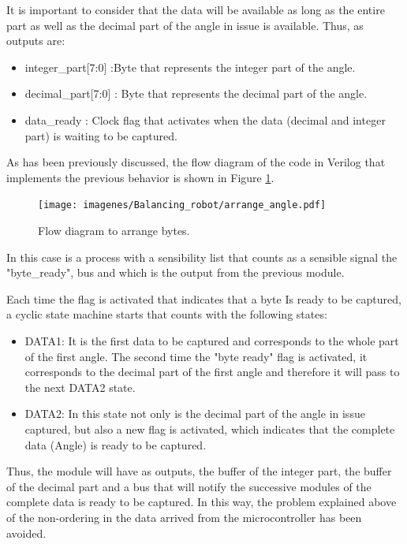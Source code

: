 It is important to consider that the data will be available as long as the entire part as well as the decimal part of the angle in issue is available. Thus, as outputs are:

\begin{itemize}
	\item integer\_part[7:0] :Byte that represents the integer part of the angle.
	\item decimal\_part[7:0] : Byte that represents the decimal part of the angle.
	\item data\_ready : Clock flag that activates when the data (decimal and integer part) is waiting to be captured.
\end{itemize}

As has been previously discussed, the flow diagram of the code in Verilog that implements the previous behavior is shown in Figure \ref{fig:arrange_angle}.

\begin{figure}[H]
	\center
	\texttt{[image: imagenes/Balancing\_robot/arrange\_angle.pdf]}
	\caption{Flow diagram to arrange bytes.}
	\label{fig:arrange_angle}
\end{figure}



In this case is a process with a sensibility list that counts as a sensible signal the "byte\_ready", bus and which is the output from the previous module. \newline

Each time the flag is activated that indicates that a byte Is ready to be captured, a cyclic state machine starts that counts with the following states:

\begin{itemize}
	\item DATA1: It is the first data to be captured and corresponds to the whole part of the first angle. The second time the "byte ready" flag is activated, it corresponds to the decimal part of the first angle and therefore it will pass to the next DATA2 state.
	\item DATA2: In this state not only is the decimal part of the angle in issue captured, but also a new flag is activated, which indicates that the complete data (Angle) is ready to be captured.
\end{itemize}

Thus, the module will have as outputs, the buffer of the integer part, the buffer of the decimal part and a bus that will notify the successive modules of the complete data is ready to be captured. In this way, the problem explained above of the non-ordering in the data arrived from the microcontroller has been avoided. \newline

